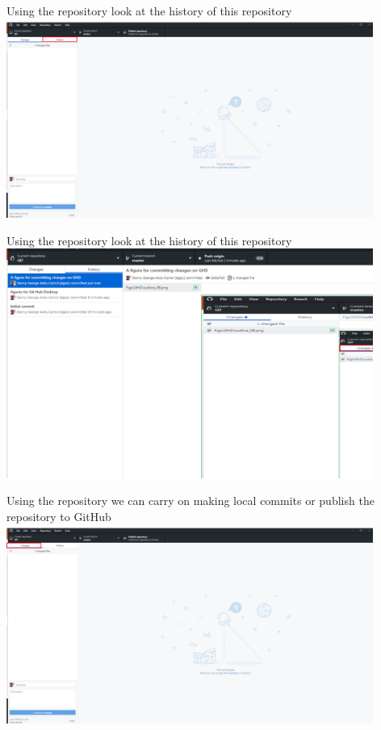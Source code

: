 \documentclass[10pt]{beamer}
\begin{document}
{\begin{frame}[fragile]{Using the repository}
\small look at the history of this repository
\includegraphics[width=12cm]{Figs/GHD/outline_06}
\end{frame}

\begin{frame}[fragile]{Using the repository}
\small look at the history of this repository
\includegraphics[width=12cm]{Figs/GHD/hist_00}
\end{frame}


\begin{frame}[fragile]{Using the repository}
\small we can carry on making local commits or publish the repository to GitHub
\includegraphics[width=12cm]{Figs/GHD/outline_07}
\end{frame}

}
\end{document}
